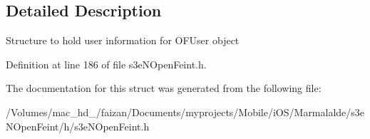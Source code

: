 \subsection{Detailed Description}
Structure to hold user information for OFUser object 

Definition at line 186 of file s3eNOpenFeint.h.



The documentation for this struct was generated from the following file:\begin{DoxyCompactItemize}
\item 
/Volumes/mac\_\-hd\_/faizan/Documents/myprojects/Mobile/iOS/Marmalalde/s3eNOpenFeint/h/s3eNOpenFeint.h\end{DoxyCompactItemize}
